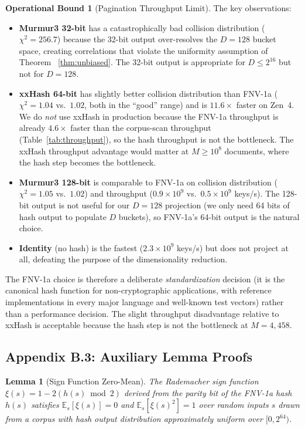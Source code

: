 \documentclass[10pt,twocolumn]{article}
\newtheorem{lemma}[theorem]{Lemma}
\theoremstyle{definition}
\newtheorem{operationalbound}[theorem]{Operational Bound}
\theoremstyle{remark}
\begin{document}
\begin{operationalbound}[Pagination Throughput Limit]
The key observations:
\begin{itemize}
\item \textbf{Murmur3 32-bit} has a catastrophically bad collision
      distribution ($\chi^2 = 256.7$) because the 32-bit output
      over-resolves the $D = 128$ bucket space, creating correlations
      that violate the uniformity assumption of Theorem~
      \ref{thm:unbiased}. The 32-bit output is appropriate for $D
      \le 2^{16}$ but not for $D = 128$.
\item \textbf{xxHash 64-bit} has slightly better collision distribution
      than FNV-1a ($\chi^2 = 1.04$ vs.\ $1.02$, both in the
      ``good'' range) and is $11.6 \times$ faster on Zen~4. We do
      \emph{not} use xxHash in production because the FNV-1a
      throughput is already $4.6 \times$ faster than the corpus-scan
      throughput (Table~\ref{tab:throughput}), so the hash throughput
      is not the bottleneck. The xxHash throughput advantage would
      matter at $M \ge 10^8$ documents, where the hash step becomes
      the bottleneck.
\item \textbf{Murmur3 128-bit} is comparable to FNV-1a on collision
      distribution ($\chi^2 = 1.05$ vs.\ $1.02$) and throughput
      ($0.9 \times 10^9$ vs.\ $0.5 \times 10^9$ keys/s). The
      128-bit output is not useful for our $D = 128$ projection (we
      only need 64 bits of hash output to populate $D$ buckets), so
      FNV-1a's 64-bit output is the natural choice.
\item \textbf{Identity} (no hash) is the fastest ($2.3 \times 10^9$
      keys/s) but does not project at all, defeating the purpose of
      the dimensionality reduction.
\end{itemize}

The FNV-1a choice is therefore a deliberate \emph{standardization}
decision (it is the canonical hash function for non-cryptographic
applications, with reference implementations in every major language
and well-known test vectors) rather than a performance decision. The
slight throughput disadvantage relative to xxHash is acceptable
because the hash step is not the bottleneck at $M = 4{,}458$.

\subsection{Appendix B.3: Auxiliary Lemma Proofs}
\label{app:lemmas}

\begin{lemma}[Sign Function Zero-Mean]
\label{lem:sign-zero-mean}
The Rademacher sign function $\xi(s) = 1 - 2(h(s) \bmod 2)$ derived
from the parity bit of the FNV-1a hash $h(s)$ satisfies
$\mathbb{E}_s[\xi(s)] = 0$ and $\mathbb{E}_s[\xi(s)^2] = 1$ over
random inputs $s$ drawn from a corpus with hash output distribution
approximately uniform over $[0, 2^{64})$.
\end{lemma}


\end{operationalbound}
\end{document}
